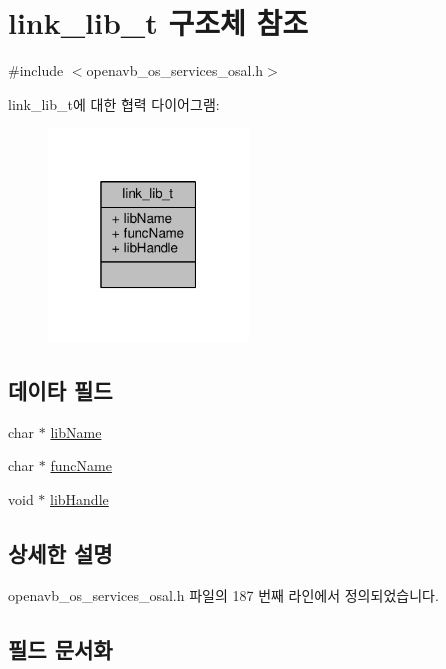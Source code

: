 \hypertarget{structlink__lib__t}{}\section{link\+\_\+lib\+\_\+t 구조체 참조}
\label{structlink__lib__t}


{\ttfamily \#include $<$openavb\+\_\+os\+\_\+services\+\_\+osal.\+h$>$}



link\+\_\+lib\+\_\+t에 대한 협력 다이어그램\+:
\nopagebreak
\begin{figure}[H]
\begin{center}
\leavevmode
\includegraphics[width=151pt]{structlink__lib__t__coll__graph}
\end{center}
\end{figure}
\subsection*{데이타 필드}
\begin{DoxyCompactItemize}
\item 
char $\ast$ \hyperlink{structlink__lib__t_a11ada1981f0d75f739f5e8949d9a3c20}{lib\+Name}
\item 
char $\ast$ \hyperlink{structlink__lib__t_addbfd1b084d058346b6bae0977f5a3b4}{func\+Name}
\item 
void $\ast$ \hyperlink{structlink__lib__t_ac1ad32e1d3b42ed9d2b736f7fbe5d4fb}{lib\+Handle}
\end{DoxyCompactItemize}


\subsection{상세한 설명}


openavb\+\_\+os\+\_\+services\+\_\+osal.\+h 파일의 187 번째 라인에서 정의되었습니다.



\subsection{필드 문서화}
